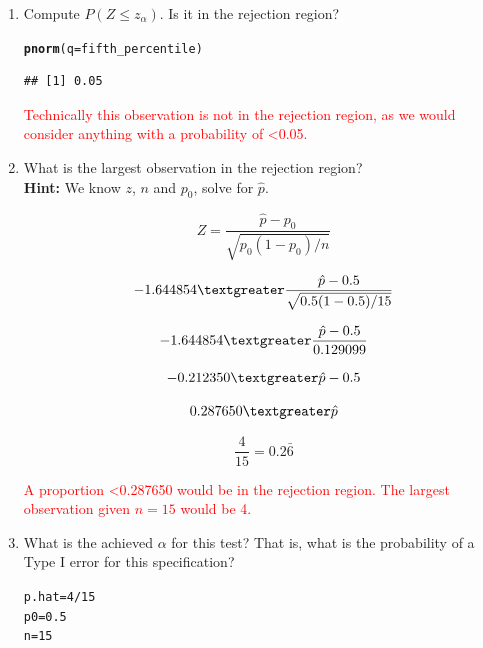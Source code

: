 \documentclass{article}\usepackage[]{graphicx}\usepackage[]{xcolor}
\makeatletter
\newcommand{\hlnum}[1]{\textcolor[rgb]{0.686,0.059,0.569}{#1}}%
\newcommand{\hlopt}[1]{\textcolor[rgb]{0,0,0}{#1}}%
\newcommand{\hldef}[1]{\textcolor[rgb]{0.345,0.345,0.345}{#1}}%
\newcommand{\hlkwb}[1]{\textcolor[rgb]{0.69,0.353,0.396}{#1}}%
\newcommand{\hlkwc}[1]{\textcolor[rgb]{0.333,0.667,0.333}{#1}}%
\newcommand{\hlkwd}[1]{\textcolor[rgb]{0.737,0.353,0.396}{\textbf{#1}}}%
\newenvironment{kframe}{%
 \def\at@end@of@kframe{}%
 \ifinner\ifhmode%
  \def\at@end@of@kframe{\end{minipage}}%
  \begin{minipage}{\columnwidth}%
 \fi\fi%
 \def\FrameCommand##1{\hskip\@totalleftmargin \hskip-\fboxsep
 \colorbox{shadecolor}{##1}\hskip-\fboxsep
     \hskip-\linewidth \hskip-\@totalleftmargin \hskip\columnwidth}%
 \MakeFramed {\advance\hsize-\width
   \@totalleftmargin\z@ \linewidth\hsize
   \@setminipage}}%
 {\par\unskip\endMakeFramed%
 \at@end@of@kframe}
\newenvironment{knitrout}{}{} %
\makeatother
\begin{document}
\begin{enumerate}
\begin{enumerate}
\begin{enumerate}
      \textcolor{red}{The 5th percentile observation is -1.645 standard deviations from the mean.}
      
      \item Compute $P(Z \leq z_\alpha)$. Is it in the rejection region?
      
\begin{knitrout}\scriptsize
{}\color{fgcolor}\begin{kframe}
\begin{alltt}
      \hlkwd{pnorm}\hldef{(}\hlkwc{q} \hldef{= fifth_percentile)}
\end{alltt}
\begin{verbatim}
## [1] 0.05
\end{verbatim}
\end{kframe}
\end{knitrout}
      
      \textcolor{red}{Technically this observation is not in the rejection region, as we would consider anything with a probability of \textless 0.05.}
      
      \item What is the largest observation in the rejection region?\\
      
      \textbf{Hint:} We know $z$, $n$ and $p_0$, solve for $\hat{p}$.
      
      \[Z = \frac{\hat{p} - p_{0}}{\sqrt{p_{0}(1-p_{0})/n}} \]
      
      \[-1.644854 \textgreater \frac{\hat{p} - 0.5}{\sqrt{0.5(1-0.5)/15}} \]
      
      \[-1.644854 \textgreater \frac{\hat{p} - 0.5}{0.129099} \]
      
      \[-0.212350 \textgreater \hat{p} - 0.5 \]
            
      \[0.287650 \textgreater \hat{p} \]
      
      \[\frac{4}{15} = 0.2\bar{6} \]
      
      \textcolor{red}{A proportion \textless 0.287650 would be in the rejection region. The largest observation given $n = 15$ would be 4.}
      
      \item What is the achieved $\alpha$ for this test? That is, what 
      is the probability of a Type I error for this specification?
      
\begin{knitrout}\scriptsize
{}\color{fgcolor}\begin{kframe}
\begin{alltt}
      \hldef{p.hat} \hlkwb{=} \hlnum{4}\hlopt{/}\hlnum{15}
      \hldef{p0} \hlkwb{=} \hlnum{0.5}
      \hldef{n} \hlkwb{=} \hlnum{15}


\end{alltt}
\end{kframe}
\end{knitrout}
\end{enumerate}
\end{enumerate}
\end{enumerate}
\end{document}

